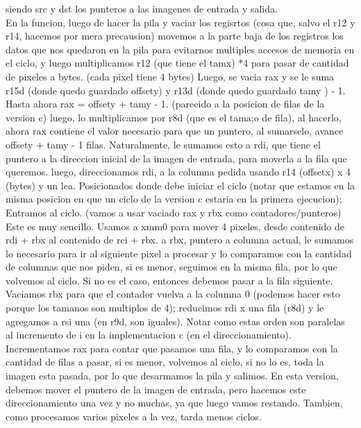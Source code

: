 \documentclass[a4paper]{article}
\begin{document}
     siendo src y dst los punteros a las imagenes de entrada y salida.
    \hfill \break
    \\
     En la funcion, luego de hacer la pila y vaciar los regisrtos (cosa que, salvo el r12 y r14, hacemos por mera precausion) movemos a la parte baja de los registros los datos que nos quedaron en la pila para evitarnos multiples accesos de memoria en el ciclo, y luego multiplicamos r12 (que tiene el tamx) *4 para pasar de cantidad de pixeles a bytes. (cada pixel tiene 4 bytes)
     \hfill \break
     Luego, se vacia rax y se le suma r15d (donde quedo guardado offsety) y r13d (donde quedo guardado tamy ) - 1.
     Hasta ahora rax = offsety + tamy - 1. (parecido a la posicion de filas de la version c) luego, lo multiplicamos por r8d (que es el tama;o de fila), al hacerlo, ahora rax contiene el valor necesario para que un puntero, al sumarselo, avance offsety + tamy - 1 filas. Naturalmente, le sumamos esto a rdi, que tiene el puntero a la direccion inicial de la imagen de entrada, para moverla a la fila que queremos. luego, direccionamos rdi, a la columna pedida usando r14 (offsetx) x 4 (bytes) y un lea. Posicionados donde debe iniciar el ciclo (notar que estamos en la misma posicion en que un ciclo de la version c estaria  en la primera ejecucion);
     \hfill \break
      Entramos al ciclo. (vamos a usar vaciado rax y rbx como contadores/punteros)
       Este es muy sencillo. Usamos a xmm0 para mover 4 pixeles, desde contenido de rdi + rbx al contenido de rci + rbx.
      a rbx,  puntero a columna actual, le sumamos lo necesario para ir al siguiente pixel a procesar y lo comparamos con la cantidad de columnas que nos piden, si es menor, seguimos en la misma fila, por lo que volvemos al ciclo.       
      Si no es el caso, entonces debemos pasar a la fila siguiente. Vaciamos rbx para que el contador vuelva a la columna 0 (podemos hacer esto porque los tamanos son multiplos de 4); reducimos rdi x una fila (r8d) y le agregamos a rsi una (en r9d, son iguales). Notar como estas orden son paralelas al incremento de i  en la implementacion c (en el direccionamiento).
      \hfill \break      
      Incrementamos rax para contar que pasamos una fila, y lo comparamos con la cantidad de filas a pasar, si es menor, volvemos al ciclo, si no lo es, toda la imagen esta pasada, por lo que desarmamos la pila y salimos.
      \hfill \break
      En esta version, debemos mover el puntero de la imagen de entrada, pero hacemos este direccionamiento una vez y no muchas, ya que luego vamos restando. Tambien, como procesamos varios pixeles a la vez, tarda menos ciclos.
	     
\end{document}
